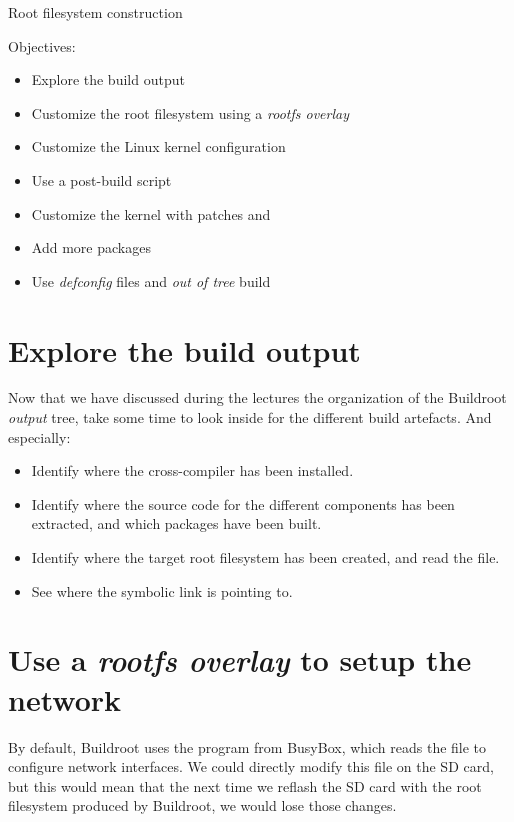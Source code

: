 \subchapter
{Root filesystem construction}
{Objectives:
  \begin{itemize}
  \item Explore the build output
  \item Customize the root filesystem using a {\em rootfs overlay}
  \item Customize the Linux kernel configuration
  \item Use a post-build script
  \item Customize the kernel with patches and
  \item Add more packages
  \item Use {\em defconfig} files and {\em out of tree} build
  \end{itemize}
}

\section{Explore the build output}

Now that we have discussed during the lectures the organization of the
Buildroot {\em output} tree, take some time to look inside
 for the different build artefacts. And especially:

\begin{itemize}

\item Identify where the cross-compiler has been installed.

\item Identify where the source code for the different components has
  been extracted, and which packages have been built.

\item Identify where the target root filesystem has been created, and
  read the  file.

\item See where the  symbolic link is pointing to.

\end{itemize}

\section{Use a {\em rootfs overlay} to setup the network}

By default, Buildroot uses the  program from BusyBox, which
reads the  file to configure network
interfaces. We could directly modify this file on the SD card, but
this would mean that the next time we reflash the SD card with the
root filesystem produced by Buildroot, we would lose those changes.

